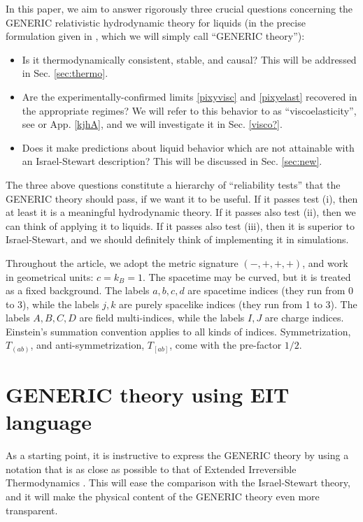 \documentclass[a4paper, amsfonts, amssymb, amsmath, reprint, showkeys, nofootinbib, twoside, onecolumn, notitlepage]{revtex4-1}
\theoremstyle{definition}
\theoremstyle{theorem}
\begin{document}
In this paper, we aim to answer rigorously three crucial questions concerning the GENERIC relativistic hydrodynamic theory for liquids (in the precise formulation given in \citep{Stricker2019}, which we will simply call ``GENERIC theory''):
%
\begin{itemize}
\item[(i)] Is it thermodynamically consistent, stable, and causal? This will be addressed in Sec. \ref{sec:thermo}.
%
\item[(ii)] Are the experimentally-confirmed limits \eqref{pixyvisc} and \eqref{pixyelast} recovered in the appropriate regimes? We will refer to this behavior to as ``viscoelasticity'', see \citep{Nettleton1959,Truesdell1965} or App. \ref{kjhA}, and we will investigate it in Sec. \ref{visco?}.    
%
\item[(iii)] Does it make predictions about liquid behavior which are not attainable with  an Israel-Stewart description? This will be discussed in Sec. \ref{sec:new}.
%
\end{itemize} 
%
The three above questions constitute a hierarchy of ``reliability tests'' that the GENERIC theory should pass, if we want it to be useful. If it passes test (i), then at least it is a meaningful hydrodynamic theory. If it passes also test (ii), then we can think of applying it to liquids. If it passes also test (iii), then it is superior to Israel-Stewart, and we should definitely think of implementing it in simulations.


Throughout the article, we adopt the metric signature $(-,+,+,+)$, and work in geometrical units: $c=k_B=1$. The spacetime may be curved, but it is treated as a fixed background. The labels $a,b,c,d$ are spacetime indices (they run from 0 to 3), while the labels $j,k$ are purely spacelike indices (they run from 1 to 3). The labels $A,B,C,D$ are field multi-indices, while the labels $I,J$ are charge indices. Einstein's summation convention applies to all kinds of indices. Symmetrization, $T_{(ab)}$, and anti-symmetrization, $T_{[ab]}$, come with the pre-factor $1/2$.

\section{GENERIC theory using EIT language}

As a starting point, it is instructive to express the GENERIC theory \cite{Stricker2019} by using a notation that is as close as possible to that of Extended Irreversible Thermodynamics \cite{Hishcock1983}. This will ease the comparison with the Israel-Stewart theory, and it will make the physical content of the GENERIC theory even more transparent.
\end{document}
